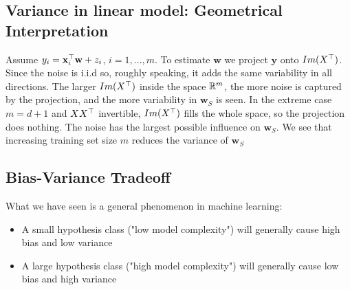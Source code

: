 \subsection{Variance in linear model: Geometrical Interpretation}
Assume $y_i = \mathbf{x}_i^{\top} \mathbf{w}+z_i$, $i=1,\ldots,m$. To estimate $\mathbf{w}$ we project $\mathbf{y}$ onto $Im(X^{\top})$.
Since the noise is i.i.d so, roughly speaking, it adds the same variability in all directions. 
The larger $Im(X^{\top})$ inside the space $\mathbb{R}^m$, the more noise is  captured by the projection, and the more variability in $\mathbf{w}_S$ is seen.
 In the extreme case $m=d+1$ and $XX^{\top}$ invertible, $Im(X^{\top})$ fills the whole space, so the projection does nothing. The noise has the largest possible influence on $\mathbf{w}_S$.
 We see that increasing training set size $m$ reduces the variance of $\mathbf{w}_S$

\newpage
\subsection{Bias-Variance Tradeoff}
What we have seen is a general phenomenon in machine learning:
      \begin{itemize}
               \item A small hypothesis class ("low model complexity") will generally  cause high bias and low variance
        \item A large hypothesis class ("high model complexity") will generally cause low bias and high variance
      \end{itemize}












